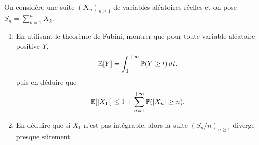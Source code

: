 \begin{td-exo}\,\\
    On considère une suite \iid{} \({(X_n)}_{n \geq 1}\) de variables aléatoires
    réelles et on pose \(S_n = \sum_{k=1}^n X_k\).
    \begin{enumerate}
        \item En utilisant le théorème de Fubini, montrer que
        pour toute variable aléatoire positive \(Y\),
        \begin{equation*}
            \mathbb{E}[Y] = \int_0^{+\infty} \mathbb{P}(Y \geq t) \mathop{}\!{d} t.
        \end{equation*}
        puis en déduire que 
        \begin{equation*}
            \mathbb{E}[|X_1|] \leq 1 + \sum_{n=1}^{+\infty} \mathbb{P}(|X_n| \geq n).
        \end{equation*}

        \item En déduire que si \(X_1\) n'est pas intégrable,
        alors la suite \({(S_n/n)}_{n \geq 1}\) diverge presque sûrement.
    \end{enumerate}
\end{td-exo}

